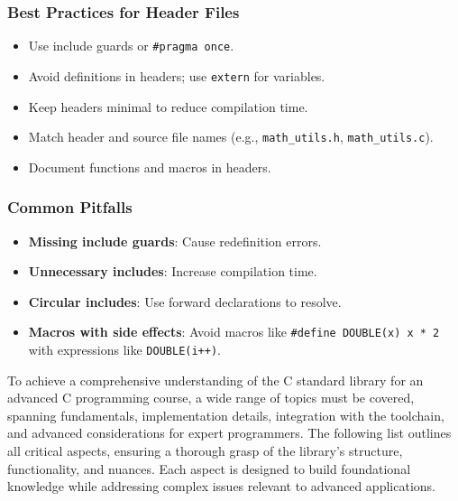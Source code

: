 \documentclass[a4paper,12pt]{article}
\begin{document}
\subsubsection*{Best Practices for Header Files}
\begin{itemize}[noitemsep]
    \item Use include guards or \texttt{\#pragma once}.
    \item Avoid definitions in headers; use \texttt{extern} for variables.
    \item Keep headers minimal to reduce compilation time.
    \item Match header and source file names (e.g., \texttt{math\_utils.h}, \texttt{math\_utils.c}).
    \item Document functions and macros in headers.
\end{itemize}

\subsubsection*{Common Pitfalls}
\begin{itemize}[noitemsep]
    \item \textbf{Missing include guards}: Cause redefinition errors.
    \item \textbf{Unnecessary includes}: Increase compilation time.
    \item \textbf{Circular includes}: Use forward declarations to resolve.
    \item \textbf{Macros with side effects}: Avoid macros like \texttt{\#define DOUBLE(x) x * 2} with expressions like \texttt{DOUBLE(i++)}.
\end{itemize}

To achieve a comprehensive understanding of the C standard library for an advanced C programming course, a wide range of topics must be covered, spanning fundamentals, implementation details, integration with the toolchain, and advanced considerations for expert programmers. The following list outlines all critical aspects, ensuring a thorough grasp of the library’s structure, functionality, and nuances. Each aspect is designed to build foundational knowledge while addressing complex issues relevant to advanced applications.
\end{document}
